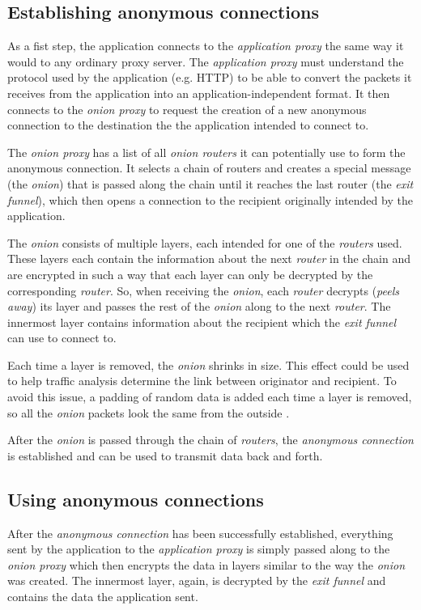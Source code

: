 \documentclass{sig-alternate}
\begin{document}
\subsection{Establishing anonymous connections}
As a fist step, the application connects to the \emph{application proxy} the same way it would to
any ordinary proxy server. The \emph{application proxy} must understand the protocol used by the
application (e.g. HTTP) to be able to convert the packets it receives from the application into an
application-independent format. It then connects to the \emph{onion proxy} to request the
creation of a new anonymous connection to the destination the the application intended to connect to.

The \emph{onion proxy} has a list of all \emph{onion routers} it can potentially use to form
the anonymous connection. It selects a chain of routers and creates a special message (the \emph{onion})
that is passed along the chain until it reaches the last router (the \emph{exit funnel}), which then
opens a connection to the recipient originally intended by the application.

The \emph{onion} consists of multiple layers, each intended for one of the \emph{routers} used.
These layers each contain the information about the next \emph{router} in the chain and are encrypted
in such a way that each layer can only be decrypted by the corresponding \emph{router}. So, when receiving
the \emph{onion}, each \emph{router} decrypts (\emph{peels away}) its layer and passes the rest of the
\emph{onion} along to the next \emph{router}. The innermost layer contains information about the
recipient which the \emph{exit funnel} can use to connect to.

Each time a layer is removed, the \emph{onion} shrinks in size. This effect could be used to help traffic
analysis determine the link between originator and recipient. To avoid this issue, a padding of random data
is added each time a layer is removed, so all the \emph{onion} packets look the same from the
outside \cite{ren2009}.

After the \emph{onion} is passed through the chain of \emph{routers}, the \emph{anonymous connection}
is established and can be used to transmit data back and forth.

\subsection{Using anonymous connections}
After the \emph{anonymous connection} has been successfully established, everything sent by the application
to the \emph{application proxy} is simply passed along to the \emph{onion proxy} which then encrypts the
data in layers similar to the way the \emph{onion} was created. The innermost layer, again, is decrypted
by the \emph{exit funnel} and contains the data the application sent.
\end{document}
